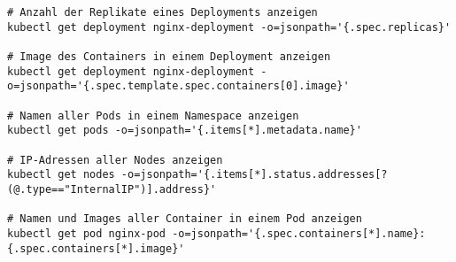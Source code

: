 \begin{verbatim}
# Anzahl der Replikate eines Deployments anzeigen
kubectl get deployment nginx-deployment -o=jsonpath='{.spec.replicas}'

# Image des Containers in einem Deployment anzeigen
kubectl get deployment nginx-deployment -o=jsonpath='{.spec.template.spec.containers[0].image}'

# Namen aller Pods in einem Namespace anzeigen
kubectl get pods -o=jsonpath='{.items[*].metadata.name}'

# IP-Adressen aller Nodes anzeigen
kubectl get nodes -o=jsonpath='{.items[*].status.addresses[?(@.type=="InternalIP")].address}'

# Namen und Images aller Container in einem Pod anzeigen
kubectl get pod nginx-pod -o=jsonpath='{.spec.containers[*].name}:{.spec.containers[*].image}'
\end{verbatim}